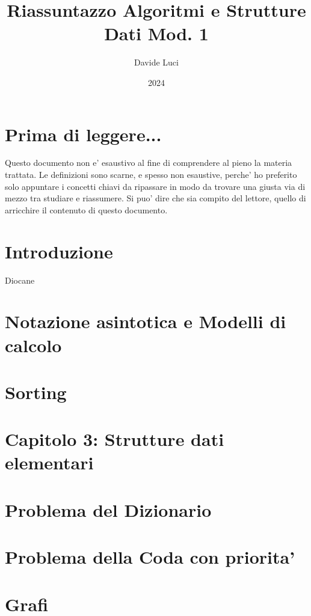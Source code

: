 \documentclass{article}
\title{Riassuntazzo Algoritmi e Strutture Dati Mod. 1}
\author{Davide Luci}
\date{2024}
\begin{document}
    \maketitle
    \tableofcontents
    \newpage


    \setlength{\parindent}{0pt}
    \section{ Prima di leggere...}
    Questo documento non e' esaustivo al fine di comprendere al pieno la materia trattata.
    Le definizioni sono scarne, e spesso non esaustive, perche' ho preferito solo appuntare i concetti chiavi
    da ripassare in modo da trovare una giusta via di mezzo tra studiare e riassumere. Si puo' dire che sia compito del 
    lettore, quello di arricchire il contenuto di questo documento.

    \newpage

    \section*{ Introduzione}
    Diocane

    \newpage
    \section{ Notazione asintotica e Modelli di calcolo}

    \newpage
    \section{ Sorting }

    \newpage
    \section{ Capitolo 3: Strutture dati elementari }
        
        \newpage
    \section {Problema del Dizionario}
        
        \newpage
    \section {Problema della Coda con priorita'}
        
        \newpage

    \section {Grafi}
        
\end{document}
